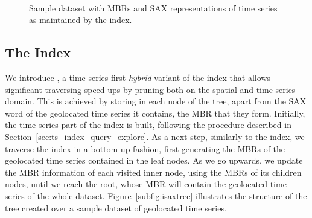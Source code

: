 \begin{figure}[!t]
 \centering
  \\
 \caption{Sample dataset with MBRs and SAX representations of time series as maintained by the \hisax index.}
 \label{fig:example}
\end{figure}

\subsection{The \hisax Index}
\label{subsec:hisax}

We introduce \hisax, a time series-first {\em hybrid} variant of the \isax index that allows significant traversing speed-ups by pruning both on the spatial and time series domain. This is achieved by storing in each node of the tree, apart from the SAX word of the geolocated time series it contains, the MBR that they form. Initially, the time series part of the index is built, following the procedure described in Section~\ref{sec:ts_index_query_explore}. As a next step, similarly to the \btsr index, we traverse the index in a bottom-up fashion, first generating the MBRs of the geolocated time series contained in the leaf nodes. As we go upwards, we update the MBR information of each visited inner node, using the MBRs of its children nodes, until we reach the root, whose MBR will contain the geolocated time series of the whole dataset. Figure~\ref{subfig:isaxtree} illustrates the structure of the \hisax tree created over a sample dataset of geolocated time series.

